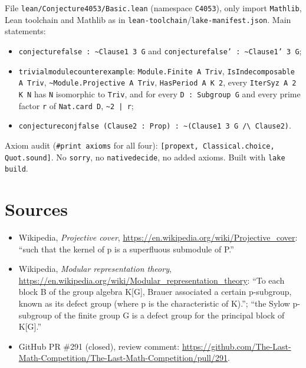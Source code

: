\documentclass[11pt]{article}
\renewcommand{\_}{\oldus\allowbreak}
\theoremstyle{definition}
\theoremstyle{remark}
\begin{document}
File \texttt{lean/Conjecture4053/Basic.lean} (namespace \texttt{C4053}), only import \texttt{Mathlib},
Lean toolchain and Mathlib as in \texttt{lean-toolchain}/\texttt{lake-manifest.json}. Main statements:
\begin{itemize}[leftmargin=1.5em]
\item \texttt{conjecture\_4053\_false : \textasciitilde Clause1 3 G} and
\texttt{conjecture\_4053\_false' : \textasciitilde Clause1' 3 G};
\item \texttt{trivial\_module\_counterexample}: \texttt{Module.Finite A Triv},
\texttt{IsIndecomposable A Triv}, \texttt{\textasciitilde Module.Projective A Triv},
\texttt{HasPeriod A K 2}, every \texttt{IterSyz A 2 K N} has \texttt{N} isomorphic to \texttt{Triv}, and
for every \texttt{D : Subgroup G} and every prime factor \texttt{r} of \texttt{Nat.card D},
\texttt{\textasciitilde 2 | r};
\item \texttt{conjecture\_4053\_conj\_false (Clause2 : Prop) : \textasciitilde(Clause1 3 G /\textbackslash{} Clause2)}.
\end{itemize}
Axiom audit (\texttt{\#print axioms} for all four): \texttt{[propext, Classical.choice, Quot.sound]}.
No \texttt{sorry}, no \texttt{native\_decide}, no added axioms. Built with \texttt{lake build}.

\section*{Sources}
\begin{itemize}[leftmargin=1.5em]
\item Wikipedia, \emph{Projective cover}, \url{https://en.wikipedia.org/wiki/Projective_cover}:
``such that the kernel of p is a superfluous submodule of P.''
\item Wikipedia, \emph{Modular representation theory},
\url{https://en.wikipedia.org/wiki/Modular_representation_theory}: ``To each block B of the group
algebra K[G], Brauer associated a certain p-subgroup, known as its defect group (where p is the
characteristic of K).''; ``the Sylow p-subgroup of the finite group G is a defect group for the
principal block of K[G].''
\item GitHub PR \#291 (closed), review comment:
\url{https://github.com/The-Last-Math-Competition/The-Last-Math-Competition/pull/291}.
\end{itemize}
\end{document}
